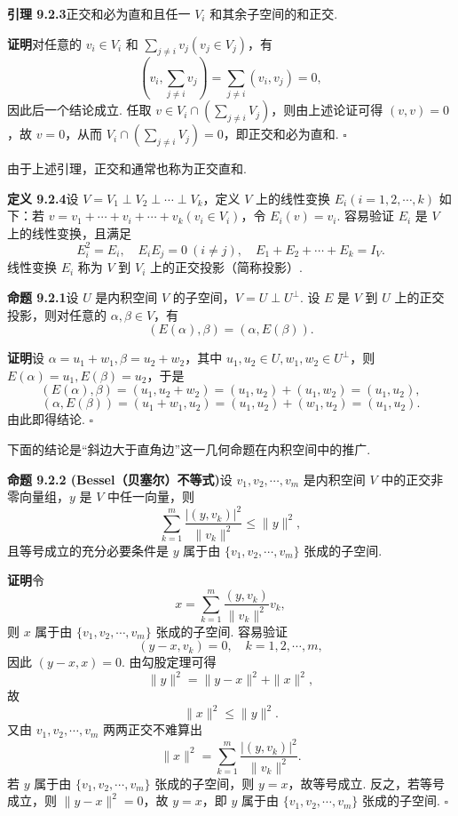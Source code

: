\documentclass[UTF8, 12pt, fontset=fandol, oneside]{ctexart}
\begin{document}
\noindent\textbf{引理 9.2.3}\quad 正交和必为直和且任一 $V_i$ 和其余子空间的和正交.

\noindent\textbf{证明}\quad 对任意的 $v_i\in V_i$ 和 $\sum_{j\ne i}v_j(v_j\in V_j)$，有
\[
  \left(v_i,\sum_{j\ne i}v_j\right)=\sum_{j\ne i}(v_i,v_j)=0,
\]
因此后一个结论成立. 任取 $v\in V_i\cap\left(\sum_{j\ne i}V_j\right)$，则由上述论证可得 $(v,v)=0$，故 $v=0$，从而 $V_i\cap\left(\sum_{j\ne i}V_j\right)=0$，即正交和必为直和. $\square$

由于上述引理，正交和通常也称为正交直和.

\noindent\textbf{定义 9.2.4}\quad 设 $V=V_1\perp V_2\perp\cdots\perp V_k$，定义 $V$ 上的线性变换 $E_i(i=1,2,\cdots,k)$ 如下：若 $v=v_1+\cdots+v_i+\cdots+v_k(v_i\in V_i)$，令 $E_i(v)=v_i$. 容易验证 $E_i$ 是 $V$ 上的线性变换，且满足
\[
  E_i^2=E_i,\quad E_iE_j=0\ (i\ne j),\quad E_1+E_2+\cdots+E_k=I_V.
\]
线性变换 $E_i$ 称为 $V$ 到 $V_i$ 上的正交投影（简称投影）.

\noindent\textbf{命题 9.2.1}\quad 设 $U$ 是内积空间 $V$ 的子空间，$V=U\perp U^\perp$. 设 $E$ 是 $V$ 到 $U$ 上的正交投影，则对任意的 $\alpha,\beta\in V$，有
\[
  (E(\alpha),\beta)=(\alpha,E(\beta)).
\]

\noindent\textbf{证明}\quad 设 $\alpha=u_1+w_1,\beta=u_2+w_2$，其中 $u_1,u_2\in U,w_1,w_2\in U^\perp$，则 $E(\alpha)=u_1,E(\beta)=u_2$，于是
\[
  (E(\alpha),\beta)=(u_1,u_2+w_2)=(u_1,u_2)+(u_1,w_2)=(u_1,u_2),
\]
\[
  (\alpha,E(\beta))=(u_1+w_1,u_2)=(u_1,u_2)+(w_1,u_2)=(u_1,u_2).
\]
由此即得结论. $\square$

下面的结论是``斜边大于直角边''这一几何命题在内积空间中的推广.

\noindent\textbf{命题 9.2.2 (Bessel（贝塞尔）不等式)}\quad 设 $v_1,v_2,\cdots,v_m$ 是内积空间 $V$ 中的正交非零向量组，$y$ 是 $V$ 中任一向量，则
\[
  \sum_{k=1}^m\frac{|(y,v_k)|^2}{\|v_k\|^2}\le \|y\|^2,
\]
且等号成立的充分必要条件是 $y$ 属于由 $\{v_1,v_2,\cdots,v_m\}$ 张成的子空间.

\noindent\textbf{证明}\quad 令
\[
  x=\sum_{k=1}^m\frac{(y,v_k)}{\|v_k\|^2}v_k,
\]
则 $x$ 属于由 $\{v_1,v_2,\cdots,v_m\}$ 张成的子空间. 容易验证
\[
  (y-x,v_k)=0,\quad k=1,2,\cdots,m,
\]
因此 $(y-x,x)=0$. 由勾股定理可得
\[
  \|y\|^2=\|y-x\|^2+\|x\|^2,
\]
故
\[
  \|x\|^2\le \|y\|^2.
\]
又由 $v_1,v_2,\cdots,v_m$ 两两正交不难算出
\[
  \|x\|^2=\sum_{k=1}^m\frac{|(y,v_k)|^2}{\|v_k\|^2}.
\]
若 $y$ 属于由 $\{v_1,v_2,\cdots,v_m\}$ 张成的子空间，则 $y=x$，故等号成立. 反之，若等号成立，则 $\|y-x\|^2=0$，故 $y=x$，即 $y$ 属于由 $\{v_1,v_2,\cdots,v_m\}$ 张成的子空间. $\square$
\end{document}
